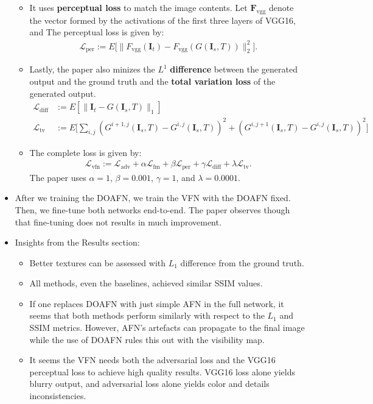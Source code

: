 \documentclass[10pt]{article}
\newcommand{\ve}[1]{\pmb{#1}}
\newcommand{\mc}[1]{\mathcal{#1}}
\newcommand{\mrm}[1]{\mathrm{#1}}
\begin{document}
\begin{itemize}
\begin{itemize}
  		\item It uses \textbf{perceptual loss} to match the image contents. Let $\ve{F}_{\mrm{vgg}}$ denote the vector formed by the activations of the first three layers of VGG16, and  The perceptual loss is given by:
  		\begin{align*}
  			\mc{L}_{\mrm{per}} := E \Big[ \| F_{\mrm{vgg}}(\ve{I}_t) - F_{\mrm{vgg}}(G(\ve{I}_s,T)) \|_2^2 \Big].
  		\end{align*}


  		\item Lastly, the paper also minizes the $L^1$ \textbf{difference} between the generated output and the ground truth and the \textbf{total variation loss} of the generated output.
  		\begin{align*}
  			\mc{L}_{\mrm{diff}} 
  			&:= E [ \| \ve{I}_t - G(\ve{I}_s, T) \|_1 ]\\
  			\mc{L}_{\mrm{tv}}
  			&:= E \bigg[ \sum_{i,j} ( G^{i+1,j}(\ve{I}_s, T) - G^{i,j}(\ve{I}_s, T) )^2 + ( G^{i,j+1}(\ve{I}_s, T) - G^{i,j}(\ve{I}_s, T) )^2 \bigg]
  		\end{align*}

  		\item The complete loss is given by:
  		\begin{align*}
  			\mc{L}_{\mrm{vfn}}
  			:= \mc{L}_{\mrm{adv}} + \alpha \mc{L}_{\mrm{fm}} + \beta \mc{L}_{\mrm{per}} + \gamma \mc{L}_{\mrm{diff}}  + \lambda \mc{L}_{\mrm{tv}}.
  		\end{align*}
  		The paper uses $\alpha = 1$, $\beta = 0.001$, $\gamma = 1$, and $\lambda = 0.0001$.
  	\end{itemize}

  	\item After we training the DOAFN, we train the VFN with the DOAFN fixed. Then, we fine-tune both networks end-to-end. The paper observes though that fine-tuning does not results in much improvement.

  	\item Insights from the Results section:
  	\begin{itemize}
  		\item Better textures can be assessed with $L_1$ difference from the ground truth.

  		\item All methods, even the baselines, achieved similar SSIM values.

  		\item If one replaces DOAFN with just simple AFN in the full network, it seems that both methods perform similarly with respect to the $L_1$ and SSIM metrics. However, AFN's artefacts can propagate to the final image while the use of DOAFN rules this out with the visibility map.

  		\item It seems the VFN needs both the adversarial loss and the VGG16 perceptual loss to achieve high quality results. VGG16 loss alone yields blurry output, and adversarial loss alone yields color and details inconsistencies. 
  	\end{itemize}

  \end{itemize}

  
    
\end{document}
